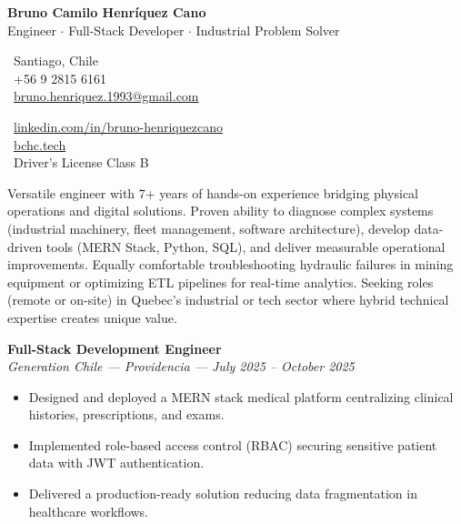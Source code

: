 \documentclass[10pt,letterpaper]{article}
\begin{document}
\begin{center}
    {\Huge \textbf{Bruno Camilo Henríquez Cano}} \\[0.2cm]
    {\Large Engineer $\cdot$ Full-Stack Developer $\cdot$ Industrial Problem Solver}
\end{center}

\vspace{0.3cm}

\noindent
\begin{minipage}[t]{0.5\textwidth}
    \faMapMarker\ Santiago, Chile \\
    \faPhone\ +56 9 2815 6161 \\
    \faEnvelope\ \href{mailto:bruno.henriquez.1993@gmail.com}{bruno.henriquez.1993@gmail.com}
\end{minipage}
\begin{minipage}[t]{0.5\textwidth}
    \faLinkedin\ \href{https://linkedin.com/in/bruno-henriquezcano}{linkedin.com/in/bruno-henriquezcano} \\
    \faGlobe\ \href{https://bchc.tech}{bchc.tech} \\
    \faCar\ Driver's License Class B
\end{minipage}

\vspace{0.4cm}


\vspace{0.2cm}

\noindent Versatile engineer with 7+ years of hands-on experience bridging physical operations and digital solutions. Proven ability to diagnose complex systems (industrial machinery, fleet management, software architecture), develop data-driven tools (MERN Stack, Python, SQL), and deliver measurable operational improvements. Equally comfortable troubleshooting hydraulic failures in mining equipment or optimizing ETL pipelines for real-time analytics. Seeking roles (remote or on-site) in Quebec's industrial or tech sector where hybrid technical expertise creates unique value.

\vspace{0.4cm}


\vspace{0.3cm}

\noindent \textbf{Full-Stack Development Engineer} \\
\textit{Generation Chile — Providencia — July 2025 – October 2025}
\begin{itemize}
    \item Designed and deployed a MERN stack medical platform centralizing clinical histories, prescriptions, and exams.
    \item Implemented role-based access control (RBAC) securing sensitive patient data with JWT authentication.
    \item Delivered a production-ready solution reducing data fragmentation in healthcare workflows.
\end{itemize}
\end{document}
